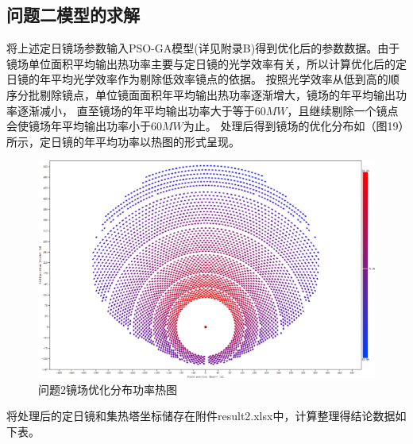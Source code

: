 \documentclass{article}
\numberwithin{equation}{subsection}
\begin{document}
\subsection{问题二模型的求解}


将上述定日镜场参数输入PSO-GA模型(详见附录B)得到优化后的参数数据。由于镜场单位面积平均输出热功率主要与定日镜的光学效率有关，所以计算优化后的定日镜的年平均光学效率作为剔除低效率镜点的依据。
按照光学效率从低到高的顺序分批剔除镜点，单位镜面面积年平均输出热功率逐渐增大，镜场的年平均输出功率逐渐减小，
直至镜场的年平均输出功率大于等于$60MW$，且继续剔除一个镜点会使镜场年平均输出功率小于$60MW$为止。
处理后得到镜场的优化分布如（图19）所示，定日镜的年平均功率以热图的形式呈现。

\begin{figure}[H]
    \centering
    \includegraphics[scale=0.23]{问题2-2镜场优化分布功率热图.png}
    \caption{问题2镜场优化分布功率热图}
\end{figure}

将处理后的定日镜和集热塔坐标储存在附件result2.xlsx中，计算整理得结论数据如下表。
\end{document}
